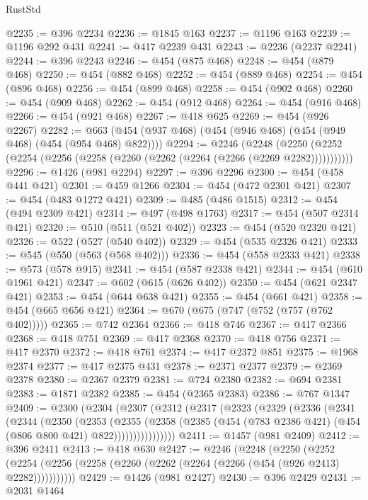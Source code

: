 \begin{lexlean}{RustStd}
\begin{coremodule}
{\begin{coremodule}
{{{{{{{{{{{{{{{{{{{{{{{{{{{{{{{{@2235 := @396 @2234
@2236 := @1845 @163
@2237 := @1196 @163
@2239 := @1196 @292 @431
@2241 := @417 @2239 @431
@2243 := @2236 (@2237 @2241)
@2244 := @396 @2243
@2246 := @454 (@875 @468)
@2248 := @454 (@879 @468)
@2250 := @454 (@882 @468)
@2252 := @454 (@889 @468)
@2254 := @454 (@896 @468)
@2256 := @454 (@899 @468)
@2258 := @454 (@902 @468)
@2260 := @454 (@909 @468)
@2262 := @454 (@912 @468)
@2264 := @454 (@916 @468)
@2266 := @454 (@921 @468)
@2267 := @418 @625
@2269 := @454 (@926 @2267)
@2282 := @663 (@454 (@937 @468) (@454 (@946 @468) (@454 (@949 @468) (@454 (@954 @468) @822))))
@2294 := @2246
    (@2248 (@2250 (@2252 (@2254 (@2256 (@2258 (@2260 (@2262 (@2264 (@2266 (@2269 @2282)))))))))))
@2296 := @1426 (@981 @2294)
@2297 := @396 @2296
@2300 := @454 (@458 @441 @421)
@2301 := @459 @1266
@2304 := @454 (@472 @2301 @421)
@2307 := @454 (@483 @1272 @421)
@2309 := @485 (@486 @1515)
@2312 := @454 (@494 @2309 @421)
@2314 := @497 (@498 @1763)
@2317 := @454 (@507 @2314 @421)
@2320 := @510 (@511 (@521 @402))
@2323 := @454 (@520 @2320 @421)
@2326 := @522 (@527 (@540 @402))
@2329 := @454 (@535 @2326 @421)
@2333 := @545 (@550 (@563 (@568 @402)))
@2336 := @454 (@558 @2333 @421)
@2338 := @573 (@578 @915)
@2341 := @454 (@587 @2338 @421)
@2344 := @454 (@610 @1961 @421)
@2347 := @602 (@615 (@626 @402))
@2350 := @454 (@621 @2347 @421)
@2353 := @454 (@644 @638 @421)
@2355 := @454 (@661 @421)
@2358 := @454 (@665 @656 @421)
@2364 := @670 (@675 (@747 (@752 (@757 (@762 @402)))))
@2365 := @742 @2364
@2366 := @418 @746
@2367 := @417 @2366
@2368 := @418 @751
@2369 := @417 @2368
@2370 := @418 @756
@2371 := @417 @2370
@2372 := @418 @761
@2374 := @417 @2372 @851
@2375 := @1968 @2374
@2377 := @417 @2375 @431
@2378 := @2371 @2377
@2379 := @2369 @2378
@2380 := @2367 @2379
@2381 := @724 @2380
@2382 := @694 @2381
@2383 := @1871 @2382
@2385 := @454 (@2365 @2383)
@2386 := @767 @1347
@2409 := @2300
    (@2304
      (@2307
        (@2312
          (@2317
            (@2323
              (@2329
                (@2336
                  (@2341
                    (@2344
                      (@2350
                        (@2353
                          (@2355
                            (@2358
                              (@2385
                                (@454 (@783 @2386 @421) (@454 (@806 @800 @421) @822))))))))))))))))
@2411 := @1457 (@981 @2409)
@2412 := @396 @2411
@2413 := @418 @630
@2427 := @2246
    (@2248
      (@2250
        (@2252 (@2254 (@2256 (@2258 (@2260 (@2262 (@2264 (@2266 (@454 (@926 @2413) @2282)))))))))))
@2429 := @1426 (@981 @2427)
@2430 := @396 @2429
@2431 := @2031 @1464
}}}}}}}}}}}}}}}}}}}}}}}}}}}}}}}}
\end{coremodule}}
\end{coremodule}
\end{lexlean}

